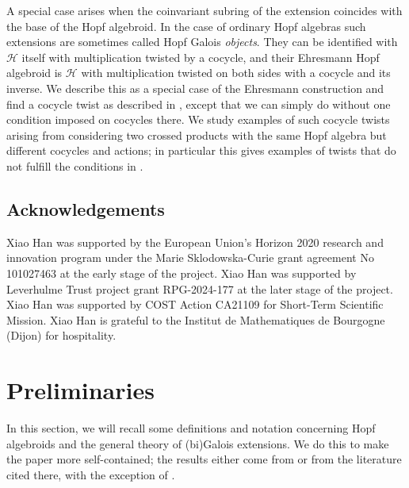 \documentclass[a4paper,reqno]{amsart}
\numberwithin{equation}{section}
\theoremstyle{plain}
\theoremstyle{remark}
\numberwithin{equation}{section}
\newcommand{\CH}{\mathcal{H}}
\begin{document}
A special case arises when the coinvariant subring of the extension coincides with the base of the Hopf algebroid. In the case of ordinary Hopf algebras \cite{schau5} such extensions are sometimes called Hopf Galois \emph{objects}. They can be identified with $\CH$ itself with multiplication twisted by a cocycle, and their Ehresmann Hopf algebroid is $\CH$ with multiplication twisted on both sides with a cocycle and its inverse. We describe this as a special case of the Ehresmann construction and find a cocycle twist as described in \cite{Boehm,HM22,HM23}, except that we can simply do without one condition imposed on cocycles there. We study examples of such cocycle twists arising from considering two crossed products with the same Hopf algebra but different cocycles and actions; in particular this gives examples of twists that do not fulfill the conditions in \cite{Boehm,HM22,HM23}.























\subsection*{Acknowledgements} Xiao Han was supported by the European Union's Horizon 2020 research and innovation program under the Marie Sklodowska-Curie grant agreement No 101027463 at the early stage of the project. Xiao Han was supported by Leverhulme Trust project grant RPG-2024-177 at the later stage of the project. Xiao Han was supported by COST Action CA21109 for Short-Term Scientific Mission. Xiao Han is grateful to the Institut de Mathematiques de Bourgogne
(Dijon) for hospitality.






 

\section{Preliminaries} \label{sec2}


In this section, we will recall some  definitions and notation concerning Hopf algebroids and the general theory of (bi)Galois extensions. We do this to make the paper more self-contained; the results either come from \cite{HS25} or from the literature cited there, with the exception of .
\end{document}
